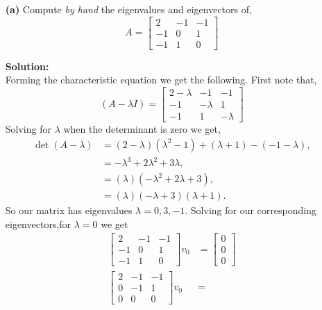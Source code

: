 \documentclass[12pt]{article}
\makeatletter
\theoremstyle{homework}
\newenvironment{exercise}[1]
{\def\@currentlabel{#1}\exercisecore}
{\endexercisecore}
\newcommand{\localhead}[1]{\par\smallskip\noindent\textbf{#1}\nobreak\\}%
\newcommand\solution{\localhead{Solution:}}
\makeatother
\begin{document}
\begin{exercise}{Problem P22} 

  \begin{enumerate}
  \item[\textbf{(a)}]  Compute \emph{by hand} the eigenvalues and eigenvectors of, 
  \begin{equation*}
    A = \begin{bmatrix}
      2 & -1 & -1\\
      -1& 0 & 1\\
      -1 & 1 & 0
    \end{bmatrix}
  \end{equation*}
  \solution
  Forming the characteristic equation we get the following. First note that, 
  \begin{equation*}
   (A - \lambda I) =  \begin{bmatrix}
      2 - \lambda & -1 & -1\\
      -1& -\lambda & 1\\
      -1 & 1 & -\lambda
    \end{bmatrix}
  \end{equation*}
  Solving for $\lambda$ when the determinant is zero we get, 
  \begin{align*}
    \det(A - \lambda) &= (2 - \lambda)(\lambda^2 - 1) + (\lambda + 1) - (-1 - \lambda),\\ 
    &= -\lambda^3+2\lambda^2+3\lambda,\\
    &= (\lambda)(-\lambda^2 + 2\lambda + 3),\\
    &= (\lambda)(-\lambda + 3)(\lambda + 1).
  \end{align*}
  So our matrix has eigenvalues $\lambda = 0, 3, -1$. Solving for our corresponding eigenvectors,for $\lambda = 0$ we get
  \begin{align*}
    \begin{bmatrix}
      2 & -1 & -1\\
      -1& 0 & 1\\
      -1 & 1 & 0
    \end{bmatrix}v_0 &=
    \begin{bmatrix}
      0\\
      0\\
      0
    \end{bmatrix}\\
    \begin{bmatrix}
      2 & -1 & -1\\
      0 & -1 & 1\\
      0 & 0 & 0
    \end{bmatrix}v_0 &=

\end{align*}
\end{enumerate}
\end{exercise}
\end{document}
